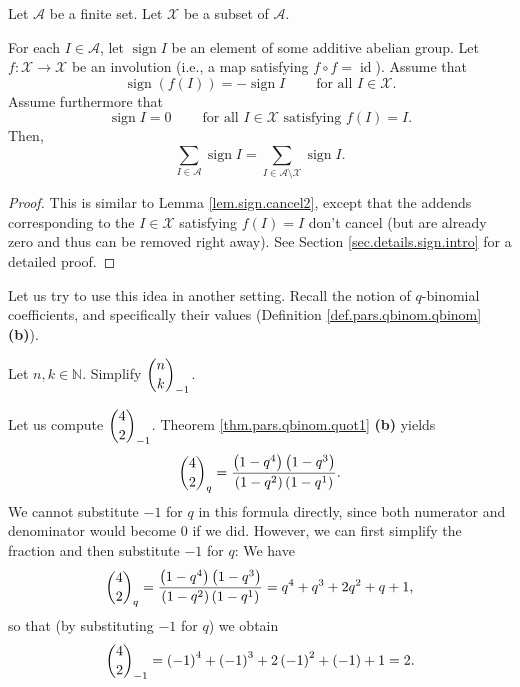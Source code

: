 \begin{lemma}
\label{lem.sign.cancel3}Let $\mathcal{A}$ be a
finite set. Let $\mathcal{X}$ be a subset of $\mathcal{A}$.

For each $I\in\mathcal{A}$, let $\operatorname*{sign}I$ be an element of some
additive abelian group. Let $f:\mathcal{X}\rightarrow\mathcal{X}$ be an
involution (i.e., a map satisfying $f\circ f=\operatorname*{id}$). Assume that%
\[
\operatorname*{sign}\left(  f\left(  I\right)  \right)  =-\operatorname*{sign}%
I\ \ \ \ \ \ \ \ \ \ \text{for all }I\in\mathcal{X}.
\]
Assume furthermore that%
\[
\operatorname*{sign}I=0\ \ \ \ \ \ \ \ \ \ \text{for all }I\in\mathcal{X}%
\text{ satisfying }f\left(  I\right)  =I.
\]
Then,%
\[
\sum_{I\in\mathcal{A}}\operatorname*{sign}I=\sum_{I\in\mathcal{A}%
\setminus\mathcal{X}}\operatorname*{sign}I.
\]

\end{lemma}

\begin{proof}
This is similar to Lemma \ref{lem.sign.cancel2}, except that the addends
corresponding to the $I\in\mathcal{X}$ satisfying $f\left(  I\right)  =I$
don't cancel (but are already zero and thus can be removed right away). See
Section \ref{sec.details.sign.intro} for a detailed proof.
\end{proof}

Let us try to use this idea in another setting. Recall the notion of
$q$-binomial coefficients, and specifically their values (Definition
\ref{def.pars.qbinom.qbinom} \textbf{(b)}).

\begin{exercise}
\label{exe.sign.-1inom}Let $n,k\in\mathbb{N}$. Simplify $\dbinom{n}{k}_{-1}$.
\end{exercise}

\begin{example}
Let us compute $\dbinom{4}{2}_{-1}$. Theorem \ref{thm.pars.qbinom.quot1}
\textbf{(b)} yields%
\[
\dbinom{4}{2}_{q}=\dfrac{\left(  1-q^{4}\right)  \left(  1-q^{3}\right)
}{\left(  1-q^{2}\right)  \left(  1-q^{1}\right)  }.
\]
We cannot substitute $-1$ for $q$ in this formula directly, since both
numerator and denominator would become $0$ if we did. However, we can first
simplify the fraction and then substitute $-1$ for $q$: We have%
\[
\dbinom{4}{2}_{q}=\dfrac{\left(  1-q^{4}\right)  \left(  1-q^{3}\right)
}{\left(  1-q^{2}\right)  \left(  1-q^{1}\right)  }=q^{4}+q^{3}+2q^{2}+q+1,
\]
so that (by substituting $-1$ for $q$) we obtain%
\[
\dbinom{4}{2}_{-1}=\left(  -1\right)  ^{4}+\left(  -1\right)  ^{3}+2\left(
-1\right)  ^{2}+\left(  -1\right)  +1=2.
\]

\end{example}

